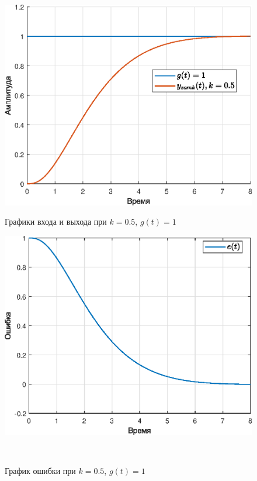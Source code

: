 \documentclass[a4paper]{article}
\begin{document}
\begin{figure}[H]
    \begin{minipage}{0.5\textwidth}
        \centering \includegraphics[width=\textwidth]{ex4/k0.5_g_a.eps}
        \caption{Графики входа и выхода при $k=0.5$, $g(t)=1$}
    \end{minipage}\hfill
    \begin{minipage}{0.5\textwidth}
        \centering \includegraphics[width=\textwidth]{ex4/k0.5_g_a_error.eps}
        \caption{График ошибки при $k=0.5$, $g(t)=1$}
    \end{minipage}\\[1em]
\end{figure}\noindent\
\end{document}
